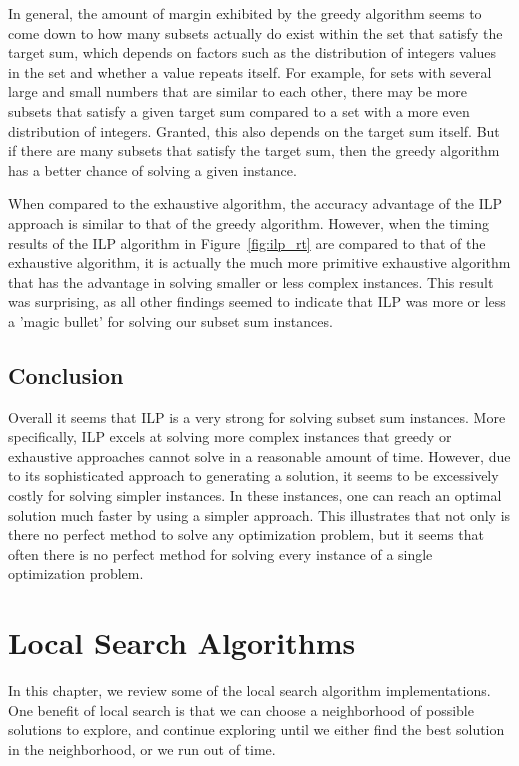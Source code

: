\documentclass{report}
\begin{document}
In general, the amount of margin exhibited by the greedy algorithm seems to come down to how many
subsets actually do exist within the set that satisfy the target sum, which depends on factors such 
as the distribution of integers values in the set and whether a value repeats itself.
For example, for sets with several large and small numbers that are similar to each other, there may
be more subsets that satisfy a given target sum compared to a set with a more even distribution of integers.
Granted, this also depends on the target sum itself. But if there are many subsets that satisfy the
target sum, then the greedy algorithm has a better chance of solving a given instance. 

When compared to the exhaustive algorithm, the accuracy advantage of the ILP approach is similar to
that of the greedy algorithm. However, when the timing results of the ILP algorithm in Figure~\ref{fig:ilp_rt}
are compared to that of the exhaustive algorithm, it is actually the much more primitive exhaustive
algorithm that has the advantage in solving smaller or less complex instances. This result was surprising,
as all other findings seemed to indicate that ILP was more or less a 'magic bullet' for solving our
subset sum instances.

\section{Conclusion}

Overall it seems that ILP is a very strong for solving subset sum instances.
More specifically, ILP excels at solving more complex instances that greedy or exhaustive
approaches cannot solve in a reasonable amount of time. However, due to its sophisticated approach to generating
a solution, it seems to be excessively costly for solving simpler instances. In these instances, one can reach
an optimal solution much faster by using a simpler approach. This illustrates that not only is there no perfect 
method to solve any optimization problem, but it seems that often there is no perfect method for solving every
instance of a single optimization problem.


\chapter{Local Search Algorithms}
In this chapter, we review some of the local search algorithm implementations. One benefit of local search
is that we can choose a neighborhood of possible solutions to explore, and continue exploring until we
either find the best solution in the neighborhood, or we run out of time. 
\end{document}
